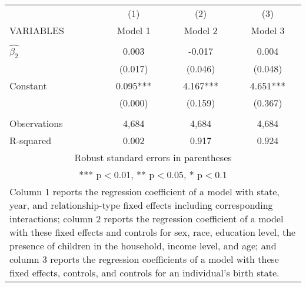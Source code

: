 \begin{tabular}{lccc}
\hline
 & (1) & (2) & (3) \\
VARIABLES & Model 1 & Model 2 & Model 3 \\ \hline
 &  &  &  \\
$\hat{\beta_2}$ & 0.003 & -0.017 & 0.004 \\
 & (0.017) & (0.046) & (0.048) \\
Constant & 0.095*** & 4.167*** & 4.651*** \\
 & (0.000) & (0.159) & (0.367) \\
 &  &  &  \\
Observations & 4,684 & 4,684 & 4,684 \\
 R-squared & 0.002 & 0.917 & 0.924 \\ \hline
\multicolumn{4}{c}{ Robust standard errors in parentheses} \\
\multicolumn{4}{c}{ *** p$<$0.01, ** p$<$0.05, * p$<$0.1} \\
\multicolumn{4}{p{0.8\linewidth}}{\small Column 1 reports the regression coefficient of a model with state, year, and relationship-type fixed effects including corresponding interactions; column 2 reports the regression coefficient of a model with these fixed effects and controls for sex, race, education level, the presence of children in the household, income level, and age; and column 3 reports the regression coefficients of a model with these fixed effects, controls, and controls for an individual’s birth state.} \\
\end{tabular}
